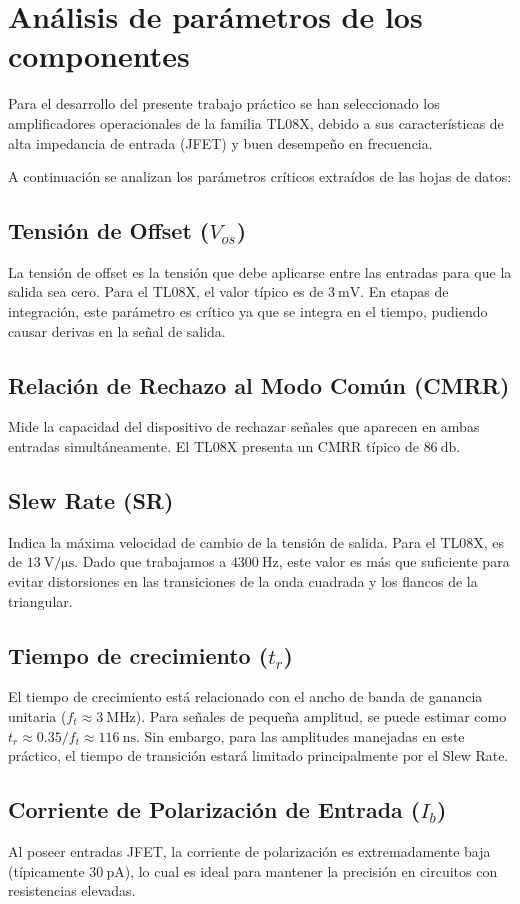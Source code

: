 \chapter{Análisis de parámetros de los componentes}
\label{chap:analisis-parametros}

Para el desarrollo del presente trabajo práctico se han seleccionado los amplificadores operacionales de la familia
TL08X, debido a sus características de alta impedancia de entrada (JFET) y buen desempeño en frecuencia.

A continuación se analizan los parámetros críticos extraídos de las hojas de datos:

\section{\texorpdfstring{Tensión de Offset ($V_{os}$)}{Tensión de Offset (Vos)}}
La tensión de offset es la tensión que debe aplicarse entre las entradas para que la salida sea cero. Para el TL08X, el
valor típico es de $\SI{3}{\milli\volt}$. En etapas de integración, este parámetro es crítico ya que se integra en el
tiempo, pudiendo causar derivas en la señal de salida.

\section{Relación de Rechazo al Modo Común (CMRR)}
Mide la capacidad del dispositivo de rechazar señales que aparecen en ambas entradas simultáneamente. El TL08X presenta
un CMRR típico de $\SI{86}{\decibel}$.

\section{Slew Rate (SR)}
Indica la máxima velocidad de cambio de la tensión de salida. Para el TL08X, es de $\SI{13}{\volt\per\micro\second}$.
Dado que trabajamos a $\SI{4300}{\hertz}$, este valor es más que suficiente para evitar distorsiones en las transiciones
de la onda cuadrada y los flancos de la triangular.

\section{Tiempo de crecimiento ($t_r$)}
El tiempo de crecimiento está relacionado con el ancho de banda de ganancia unitaria ($f_t \approx \SI{3}{\mega\hertz}$).
Para señales de pequeña amplitud, se puede estimar como $t_r \approx 0.35 / f_t \approx \SI{116}{\nano\second}$. Sin
embargo, para las amplitudes manejadas en este práctico, el tiempo de transición estará limitado principalmente por el
Slew Rate.

\section{\texorpdfstring{Corriente de Polarización de Entrada ($I_b$)}{Corriente de Polarización de Entrada (Ib)}}
Al poseer entradas JFET, la corriente de polarización es extremadamente baja (típicamente $\SI{30}{\pico\ampere}$), lo
cual es ideal para mantener la precisión en circuitos con resistencias elevadas.


